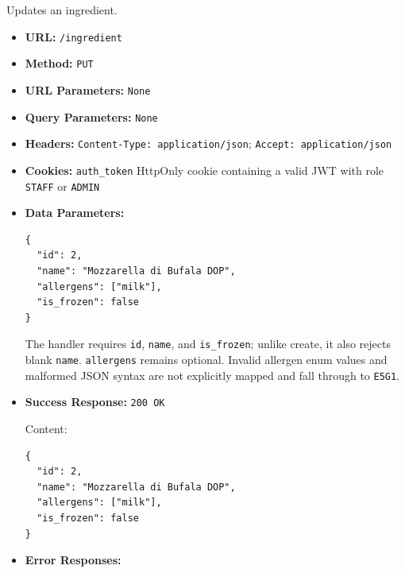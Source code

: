 Updates an ingredient.

\begin{itemize}[nosep]
\item \textbf{URL:} \texttt{/ingredient}

\item \textbf{Method:} \texttt{PUT}

\item \textbf{URL Parameters:} \texttt{None}

\item \textbf{Query Parameters:} \texttt{None}

\item \textbf{Headers:} \texttt{Content-Type: application/json}; \texttt{Accept: application/json}

\item \textbf{Cookies:} \texttt{auth\_token} HttpOnly cookie containing a valid JWT with role \texttt{STAFF} or \texttt{ADMIN}

\item \textbf{Data Parameters:}

\begin{lstlisting}
{
  "id": 2,
  "name": "Mozzarella di Bufala DOP",
  "allergens": ["milk"],
  "is_frozen": false
}
\end{lstlisting}

The handler requires \texttt{id}, \texttt{name}, and \texttt{is\_frozen}; unlike create, it also rejects blank \texttt{name}. \texttt{allergens} remains optional. Invalid allergen enum values and malformed JSON syntax are not explicitly mapped and fall through to \texttt{E5G1}.

\item \textbf{Success Response:} \texttt{200 OK}

Content:

\begin{lstlisting}
{
  "id": 2,
  "name": "Mozzarella di Bufala DOP",
  "allergens": ["milk"],
  "is_frozen": false
}
\end{lstlisting}

\item \textbf{Error Responses:}


\end{itemize}

